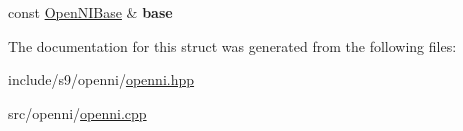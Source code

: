 \begin{DoxyCompactItemize}
\item 
\hypertarget{structs9_1_1oni_1_1OpenNISkeleton_1_1SharedObject_ab1c99416814b92b5b5c5fe6092bd3903}{const \hyperlink{classs9_1_1oni_1_1OpenNIBase}{\-Open\-N\-I\-Base} \& {\bfseries base}}\label{structs9_1_1oni_1_1OpenNISkeleton_1_1SharedObject_ab1c99416814b92b5b5c5fe6092bd3903}

\end{DoxyCompactItemize}


\-The documentation for this struct was generated from the following files\-:\begin{DoxyCompactItemize}
\item 
include/s9/openni/\hyperlink{openni_8hpp}{openni.\-hpp}\item 
src/openni/\hyperlink{openni_8cpp}{openni.\-cpp}\end{DoxyCompactItemize}
